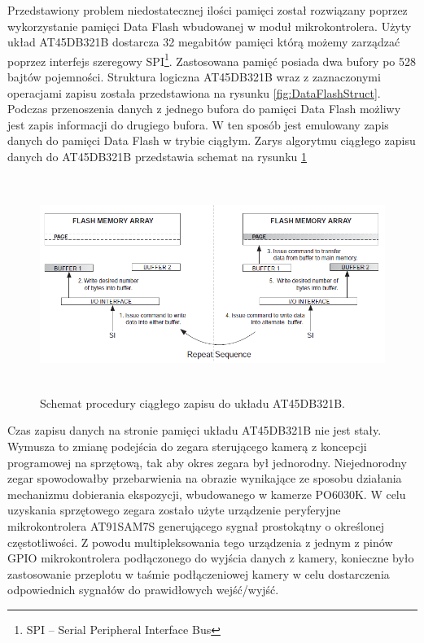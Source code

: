 Przedstawiony problem niedostatecznej ilości pamięci został rozwiązany poprzez
wykorzystanie pamięci Data Flash wbudowanej w moduł mikrokontrolera. Użyty układ
AT45DB321B\cite{AT45DB321BDataSheet} dostarcza 32 megabitów pamięci którą możemy
zarządzać poprzez interfejs szeregowy SPI\footnote{SPI -- Serial Peripheral
Interface Bus}. Zastosowana pamięć posiada dwa bufory po 528 bajtów pojemności.
Struktura logiczna AT45DB321B wraz z zaznaczonymi operacjami zapisu została
przedstawiona na rysunku \ref{fig:DataFlashStruct}.  Podczas przenoszenia danych
z jednego bufora do pamięci Data Flash możliwy jest zapis informacji do drugiego
bufora. W ten sposób jest emulowany zapis danych do pamięci Data Flash w trybie
ciągłym. Zarys algorytmu ciągłego zapisu danych do AT45DB321B przedstawia schemat
na rysunku \ref{fig:DataFlashConstantWrite}

\begin{figure}[ht!]
 \centering
 \includegraphics[height=70mm]{../images/ch04/dataflash_constant_write.png}
 \caption{Schemat procedury ciągłego zapisu do układu AT45DB321B\cite{AT45DB321BApplicationNote}.}
 \label{fig:DataFlashConstantWrite}
\end{figure}

Czas zapisu danych na stronie pamięci układu AT45DB321B nie jest stały. Wymusza
to zmianę podejścia do zegara sterującego kamerą z koncepcji programowej na
sprzętową, tak aby okres zegara był jednorodny. Niejednorodny zegar spowodowałby
przebarwienia na obrazie wynikające ze sposobu działania mechanizmu dobierania
ekspozycji, wbudowanego w kamerze PO6030K. W celu uzyskania sprzętowego zegara
zostało użyte urządzenie peryferyjne mikrokontrolera AT91SAM7S generującego
sygnał prostokątny o określonej częstotliwości. Z powodu multipleksowania tego
urządzenia z jednym z pinów GPIO mikrokontrolera podłączonego do wyjścia danych z
kamery, konieczne było zastosowanie przeplotu w taśmie podłączeniowej kamery w
celu dostarczenia odpowiednich sygnałów do prawidłowych wejść/wyjść.

